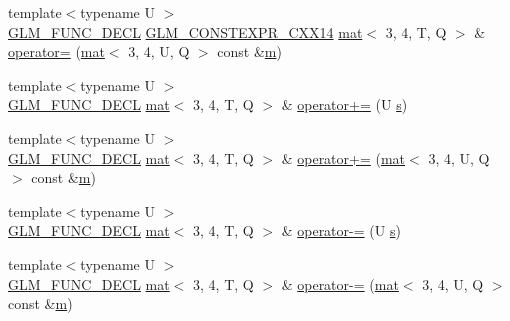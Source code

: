 \begin{DoxyCompactItemize}
\item 
{\footnotesize template$<$typename U $>$ }\\\mbox{\hyperlink{setup_8hpp_ab2d052de21a70539923e9bcbf6e83a51}{G\+L\+M\+\_\+\+F\+U\+N\+C\+\_\+\+D\+E\+CL}} \mbox{\hyperlink{setup_8hpp_a4dd12abf5e1164bc57f3a34671d03844}{G\+L\+M\+\_\+\+C\+O\+N\+S\+T\+E\+X\+P\+R\+\_\+\+C\+X\+X14}} \mbox{\hyperlink{structglm_1_1mat}{mat}}$<$ 3, 4, T, Q $>$ \& \mbox{\hyperlink{structglm_1_1mat_3_013_00_014_00_01_t_00_01_q_01_4_a78ce17c72bd4bffddaaef8c5e7f8348a}{operator=}} (\mbox{\hyperlink{structglm_1_1mat}{mat}}$<$ 3, 4, U, Q $>$ const \&\mbox{\hyperlink{_s_d_l__opengl__glext_8h_af593500c283bf1a787a6f947f503a5c2}{m}})
\item 
{\footnotesize template$<$typename U $>$ }\\\mbox{\hyperlink{setup_8hpp_ab2d052de21a70539923e9bcbf6e83a51}{G\+L\+M\+\_\+\+F\+U\+N\+C\+\_\+\+D\+E\+CL}} \mbox{\hyperlink{structglm_1_1mat}{mat}}$<$ 3, 4, T, Q $>$ \& \mbox{\hyperlink{structglm_1_1mat_3_013_00_014_00_01_t_00_01_q_01_4_a9163c941f48d04e8f91190449d98de9c}{operator+=}} (U \mbox{\hyperlink{_s_d_l__opengl_8h_a4af680a6c683f88ed67b76f207f2e6e4}{s}})
\item 
{\footnotesize template$<$typename U $>$ }\\\mbox{\hyperlink{setup_8hpp_ab2d052de21a70539923e9bcbf6e83a51}{G\+L\+M\+\_\+\+F\+U\+N\+C\+\_\+\+D\+E\+CL}} \mbox{\hyperlink{structglm_1_1mat}{mat}}$<$ 3, 4, T, Q $>$ \& \mbox{\hyperlink{structglm_1_1mat_3_013_00_014_00_01_t_00_01_q_01_4_a73961279838cd60b4889d54bf955a3b1}{operator+=}} (\mbox{\hyperlink{structglm_1_1mat}{mat}}$<$ 3, 4, U, Q $>$ const \&\mbox{\hyperlink{_s_d_l__opengl__glext_8h_af593500c283bf1a787a6f947f503a5c2}{m}})
\item 
{\footnotesize template$<$typename U $>$ }\\\mbox{\hyperlink{setup_8hpp_ab2d052de21a70539923e9bcbf6e83a51}{G\+L\+M\+\_\+\+F\+U\+N\+C\+\_\+\+D\+E\+CL}} \mbox{\hyperlink{structglm_1_1mat}{mat}}$<$ 3, 4, T, Q $>$ \& \mbox{\hyperlink{structglm_1_1mat_3_013_00_014_00_01_t_00_01_q_01_4_adfa9d48451ea4991d39f4ed1649f8afd}{operator-\/=}} (U \mbox{\hyperlink{_s_d_l__opengl_8h_a4af680a6c683f88ed67b76f207f2e6e4}{s}})
\item 
{\footnotesize template$<$typename U $>$ }\\\mbox{\hyperlink{setup_8hpp_ab2d052de21a70539923e9bcbf6e83a51}{G\+L\+M\+\_\+\+F\+U\+N\+C\+\_\+\+D\+E\+CL}} \mbox{\hyperlink{structglm_1_1mat}{mat}}$<$ 3, 4, T, Q $>$ \& \mbox{\hyperlink{structglm_1_1mat_3_013_00_014_00_01_t_00_01_q_01_4_a0e378e1f0547facbe5707f64358a0eee}{operator-\/=}} (\mbox{\hyperlink{structglm_1_1mat}{mat}}$<$ 3, 4, U, Q $>$ const \&\mbox{\hyperlink{_s_d_l__opengl__glext_8h_af593500c283bf1a787a6f947f503a5c2}{m}})

\end{DoxyCompactItemize}
